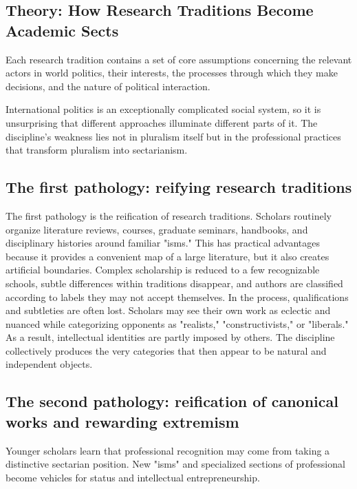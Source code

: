 \subsection{Theory: How Research Traditions Become Academic
Sects}

Each research
tradition contains a set of core assumptions concerning the relevant
actors in world politics, their interests, the processes through which
they make decisions, and the nature of political interaction.

International politics is an exceptionally complicated social system, so
it is unsurprising that different approaches illuminate different parts
of it. The discipline's weakness lies not in pluralism itself but in the
professional practices that transform pluralism into sectarianism.

\subsection{The first pathology: reifying research
traditions}

The first pathology is the reification of research traditions. Scholars
routinely organize literature reviews, courses, graduate seminars,
handbooks, and disciplinary histories around familiar "isms." This has
practical advantages because it provides a convenient map of a large
literature, but it also creates artificial boundaries. Complex
scholarship is reduced to a few recognizable schools, subtle differences
within traditions disappear, and authors are classified according to
labels they may not accept themselves. In the process, qualifications and subtleties are often lost. Scholars may see their own work
as eclectic and nuanced while categorizing opponents as "realists,"
"constructivists," or "liberals." As a result, intellectual
identities are partly imposed by others. The discipline collectively
produces the very categories that then appear to be natural and
independent objects.

\subsection{The second pathology: reification of canonical works and rewarding
extremism}

Younger scholars learn that professional
recognition may come from taking a distinctive sectarian position. New "isms" and specialized sections of professional become vehicles for status and intellectual entrepreneurship.

